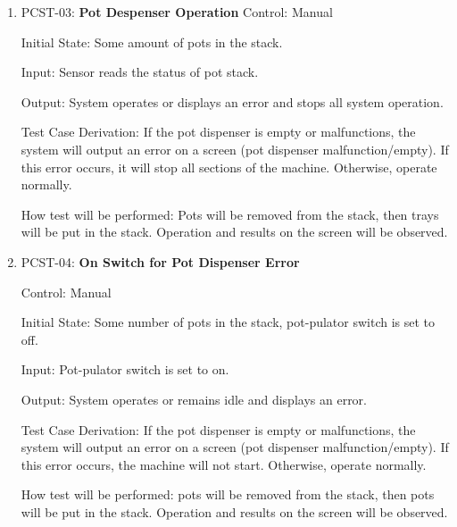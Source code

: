 \documentclass[12pt, titlepage]{article}
\begin{document}
\begin{enumerate}



\item{PCST-03: \textbf{Pot Despenser Operation }}
Control: Manual

Initial State: Some amount of pots in the stack.

Input: Sensor reads the status of pot stack.

Output: System operates or displays an error and stops all system operation. 

Test Case Derivation: If the pot dispenser is empty or malfunctions, the system will output an error on a screen (pot dispenser malfunction/empty). If this error occurs, it will stop all sections of the machine. Otherwise, operate normally. 

How test will be performed: Pots will be removed from the stack, then trays will be put in the stack. Operation and results on the screen will be observed.  
\\
\item {PCST-04: \textbf{On Switch for Pot Dispenser Error}}

Control: Manual

Initial State: Some number of pots in the stack, pot-pulator switch is set to off.

Input: Pot-pulator switch is set to on.

Output: System operates or remains idle and displays an error. 

Test Case Derivation: If the pot dispenser is empty or malfunctions, the system will output an error on a screen (pot dispenser malfunction/empty). If this error occurs, the machine will not start. Otherwise, operate normally. 

How test will be performed: pots will be removed from the stack, then pots will be put in the stack. Operation and results on the screen will be observed.  
\\


\end{enumerate}
\end{document}
